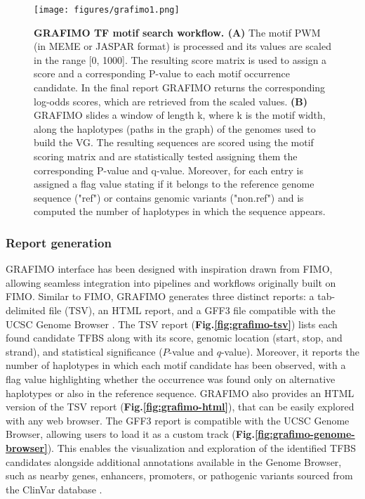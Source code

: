 \documentclass[a4paper, titlepage, openright]{book}
\newcommand{\grafimo}{GRAFIMO\xspace}
\begin{document}
\begin{figure}
	\centering
	\texttt{[image: figures/grafimo1.png]}
	\caption[\grafimo TF motif search workflow.]{\textbf{\grafimo TF motif search workflow. (A)} The motif PWM (in MEME or JASPAR format) is processed and its values are scaled in the range [0, 1000]. The resulting score matrix is used to assign a score and a corresponding P-value to each motif occurrence candidate. In the final report \grafimo returns the corresponding log-odds scores, which are retrieved from the scaled values. \textbf{(B)} \grafimo slides a window of length k, where k is the motif width, along the haplotypes (paths in the graph) of the genomes used to build the VG. The resulting sequences are scored using the motif scoring matrix and are statistically tested assigning them the corresponding P-value and q-value. Moreover, for each entry is assigned a flag value stating if it belongs to the reference genome sequence ("ref") or contains genomic variants ("non.ref") and is computed the number of haplotypes in which the sequence appears.}
	\label{fig:grafimo1}
\end{figure} 

\subsubsection{Report generation}
\grafimo interface has been designed with inspiration drawn from FIMO, allowing seamless integration into pipelines and workflows originally built on FIMO. Similar to FIMO, \grafimo generates three distinct reports: a tab-delimited file (TSV), an HTML report, and a GFF3 file compatible with the UCSC Genome Browser \citep{lee2020ucsc}. The TSV report (\textbf{Fig.\ref{fig:grafimo-tsv}}) lists each found candidate TFBS along with its score, genomic location (start, stop, and strand), and statistical significance ($P$-value and $q$-value). Moreover, it reports the number of haplotypes in which each motif candidate has been observed, with a flag value highlighting whether the occurrence was found only on alternative haplotypes or also in the reference sequence. \grafimo also provides an HTML version of the TSV report (\textbf{Fig.\ref{fig:grafimo-html}}), that can be easily explored with any web browser. The GFF3 report is compatible with the UCSC Genome Browser, allowing users to load it as a custom track (\textbf{Fig.\ref{fig:grafimo-genome-browser}}). This enables the visualization and exploration of the identified TFBS candidates alongside additional annotations available in the Genome Browser, such as nearby genes, enhancers, promoters, or pathogenic variants sourced from the ClinVar database \citep{landrum2020clinvar}.
\end{document}
